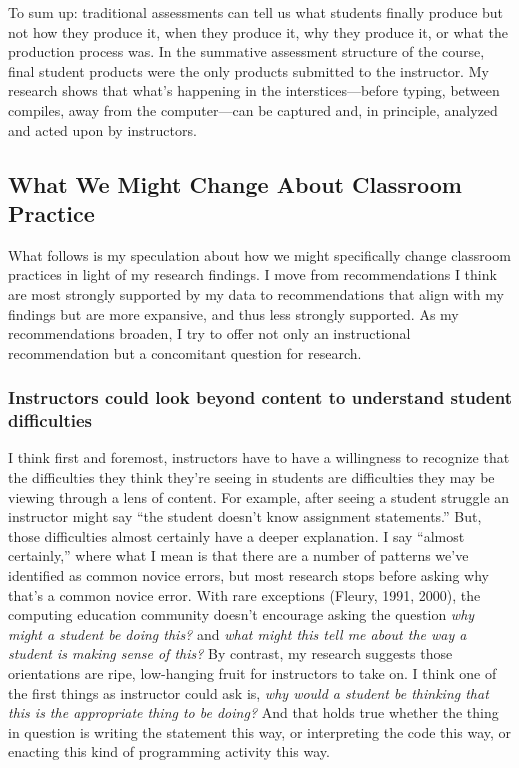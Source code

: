 To sum up: traditional assessments can tell us what students finally
produce but not how they produce it, when they produce it, why they
produce it, or what the production process was. In the summative
assessment structure of the course, final student products were the only
products submitted to the instructor. My research shows that what's
happening in the interstices---before typing, between compiles, away
from the computer---can be captured and, in principle, analyzed and
acted upon by instructors.

\subsection{What We Might Change About Classroom
Practice}\label{what-we-might-change-about-classroom-practice}

What follows is my speculation about how we might specifically change
classroom practices in light of my research findings. I move from
recommendations I think are most strongly supported by my data to
recommendations that align with my findings but are more expansive, and
thus less strongly supported. As my recommendations broaden, I try to
offer not only an instructional recommendation but a concomitant
question for research.

\subsubsection{Instructors could look beyond content to understand
student
difficulties}\label{instructors-could-look-beyond-content-to-understand-student-difficulties}

I think first and foremost, instructors have to have a willingness to
recognize that the difficulties they think they're seeing in students
are difficulties they may be viewing through a lens of content. For
example, after seeing a student struggle an instructor might say ``the
student doesn't know assignment statements.'' But, those difficulties
almost certainly have a deeper explanation. I say ``almost certainly,''
where what I mean is that there are a number of patterns we've
identified as common novice errors, but most research stops before
asking why that's a common novice error. With rare exceptions (Fleury,
1991, 2000), the computing education community doesn't encourage asking
the question \emph{why might a student be doing this?} and \emph{what
might this tell me about the way a student is making sense of this?} By
contrast, my research suggests those orientations are ripe, low-hanging
fruit for instructors to take on. I think one of the first things as
instructor could ask is, \emph{why would a student be thinking that this
is the appropriate thing to be doing?} And that holds true whether the
thing in question is writing the statement this way, or interpreting the
code this way, or enacting this kind of programming activity this way.

